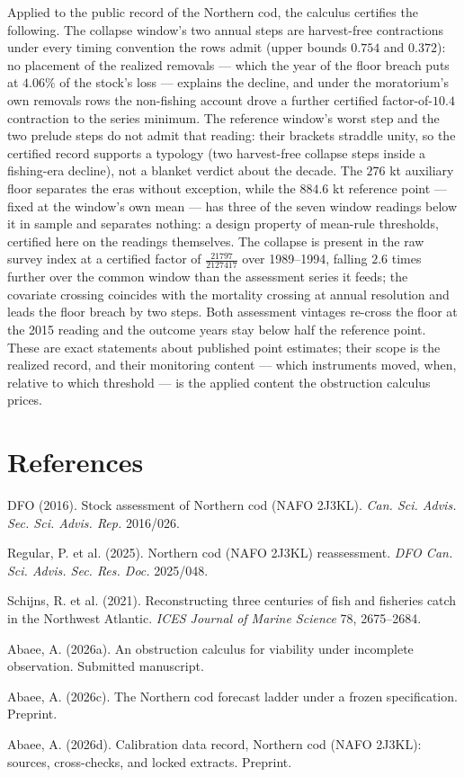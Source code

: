 \documentclass[10pt,twocolumn]{article}
\theoremstyle{plain}
\theoremstyle{remark}
\begin{document}
Applied to the public record of the Northern cod, the calculus
certifies the following. The collapse window's two annual steps are
harvest-free contractions under every timing convention the rows admit
(upper bounds \(0.754\) and \(0.372\)): no placement of the realized
removals --- which the year of the floor breach puts at \(4.06\%\) of
the stock's loss --- explains the decline, and under the moratorium's
own removals rows the non-fishing account drove a further certified
factor-of-\(10.4\) contraction to the series minimum. The reference
window's worst step and the two prelude steps do not admit that
reading: their brackets straddle unity, so the certified record
supports a typology (two harvest-free collapse steps inside a
fishing-era decline), not a blanket verdict about the decade. The
\(276\) kt auxiliary floor separates the eras without exception,
while the \(884.6\) kt reference point --- fixed at the window's own
mean --- has three of the seven window readings below it in sample
and separates nothing: a design property of mean-rule thresholds,
certified here on the readings themselves. The collapse is present in
the raw survey index at a certified factor of
\(\tfrac{21797}{2127417}\) over 1989--1994, falling \(2.6\) times
further over the common window than the assessment series it feeds;
the covariate crossing coincides with the mortality crossing at annual
resolution and leads the floor breach by two steps. Both assessment
vintages re-cross the floor at the 2015 reading and the outcome years
stay below half the reference point. These are exact statements about
published point estimates; their scope is the realized record, and
their monitoring content --- which instruments moved, when, relative to
which threshold --- is the applied content the obstruction calculus
prices.

\section*{References}

{\footnotesize
DFO (2016). Stock assessment of Northern cod (NAFO 2J3KL). \emph{Can.
Sci. Advis. Sec. Sci. Advis. Rep.} 2016/026.

Regular, P. et al. (2025). Northern cod (NAFO 2J3KL) reassessment.
\emph{DFO Can. Sci. Advis. Sec. Res. Doc.} 2025/048.

Schijns, R. et al. (2021). Reconstructing three centuries of fish and
fisheries catch in the Northwest Atlantic. \emph{ICES Journal of Marine
Science} 78, 2675--2684.

Abaee, A. (2026a). An obstruction calculus for viability under
incomplete observation. Submitted manuscript.

Abaee, A. (2026c). The Northern cod forecast ladder under a frozen
specification. Preprint.

Abaee, A. (2026d). Calibration data record, Northern cod (NAFO 2J3KL):
sources, cross-checks, and locked extracts. Preprint.
}
\end{document}
